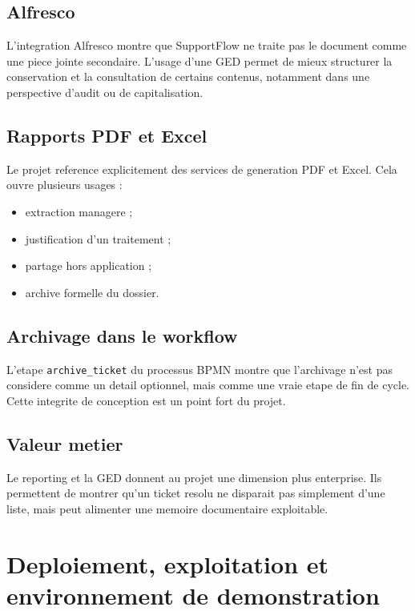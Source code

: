 \documentclass[12pt,a4paper,oneside]{report}
\begin{document}
\section{Alfresco}

L'integration Alfresco montre que SupportFlow ne traite pas le document comme une piece jointe secondaire. L'usage d'une GED permet de mieux structurer la conservation et la consultation de certains contenus, notamment dans une perspective d'audit ou de capitalisation.

\section{Rapports PDF et Excel}

Le projet reference explicitement des services de generation PDF et Excel. Cela ouvre plusieurs usages :

\begin{itemize}[leftmargin=1.2cm]
  \item extraction managere ;
  \item justification d'un traitement ;
  \item partage hors application ;
  \item archive formelle du dossier.
\end{itemize}

\section{Archivage dans le workflow}

L'etape \texttt{archive\_ticket} du processus BPMN montre que l'archivage n'est pas considere comme un detail optionnel, mais comme une vraie etape de fin de cycle. Cette integrite de conception est un point fort du projet.

\section{Valeur metier}

Le reporting et la GED donnent au projet une dimension plus enterprise. Ils permettent de montrer qu'un ticket resolu ne disparait pas simplement d'une liste, mais peut alimenter une memoire documentaire exploitable.

\chapter{Deploiement, exploitation et environnement de demonstration}
\end{document}
